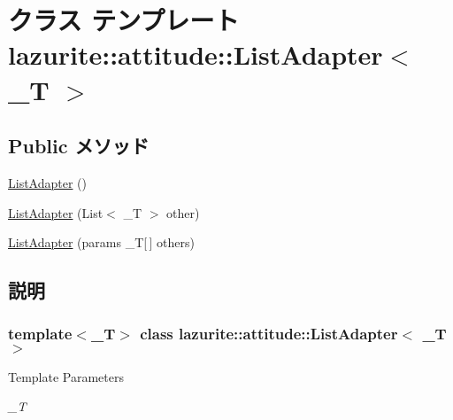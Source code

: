 \hypertarget{classlazurite_1_1attitude_1_1_list_adapter_3_01___t_01_4}{
\section{クラス テンプレート lazurite::attitude::ListAdapter$<$ \_\-T $>$}
\label{classlazurite_1_1attitude_1_1_list_adapter_3_01___t_01_4}
}
\subsection*{Public メソッド}
\begin{DoxyCompactItemize}
\item 
\hyperlink{classlazurite_1_1attitude_1_1_list_adapter_3_01___t_01_4_a739410b3db43b13876a5b7f9b63b8d5e}{ListAdapter} ()
\item 
\hyperlink{classlazurite_1_1attitude_1_1_list_adapter_3_01___t_01_4_a48c9bd58a80520924504437a1b5f2dab}{ListAdapter} (List$<$ \_\-T $>$ other)
\item 
\hyperlink{classlazurite_1_1attitude_1_1_list_adapter_3_01___t_01_4_aec37194e4a0f8fbec76e44447e330fd8}{ListAdapter} (params \_\-T\mbox{[}$\,$\mbox{]} others)
\end{DoxyCompactItemize}


\subsection{説明}
\subsubsection*{template$<$\_\-T$>$ class lazurite::attitude::ListAdapter$<$ \_\-T $>$}


\begin{DoxyTemplParams}{Template Parameters}
\item[{\em \_\-T}]\end{DoxyTemplParams}


